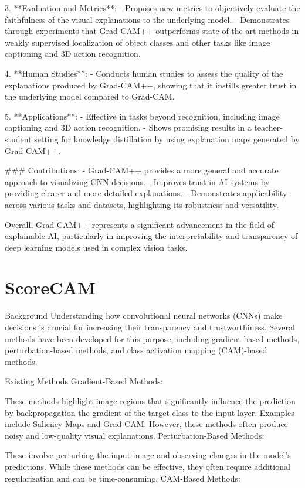 3. **Evaluation and Metrics**:
   - Proposes new metrics to objectively evaluate the faithfulness of the visual explanations to the underlying model.
   - Demonstrates through experiments that Grad-CAM++ outperforms state-of-the-art methods in weakly supervised localization of object classes and other tasks like image captioning and 3D action recognition.

4. **Human Studies**:
   - Conducts human studies to assess the quality of the explanations produced by Grad-CAM++, showing that it instills greater trust in the underlying model compared to Grad-CAM.

5. **Applications**:
   - Effective in tasks beyond recognition, including image captioning and 3D action recognition.
   - Shows promising results in a teacher-student setting for knowledge distillation by using explanation maps generated by Grad-CAM++.

### Contributions:
- Grad-CAM++ provides a more general and accurate approach to visualizing CNN decisions.
- Improves trust in AI systems by providing clearer and more detailed explanations.
- Demonstrates applicability across various tasks and datasets, highlighting its robustness and versatility.

Overall, Grad-CAM++ represents a significant advancement in the field of explainable AI, particularly in improving the interpretability and transparency of deep learning models used in complex vision tasks.

\section{ScoreCAM}
Background
Understanding how convolutional neural networks (CNNs) make decisions is crucial for increasing their transparency and trustworthiness. Several methods have been developed for this purpose, including gradient-based methods, perturbation-based methods, and class activation mapping (CAM)-based methods.

Existing Methods
Gradient-Based Methods:

These methods highlight image regions that significantly influence the prediction by backpropagation the gradient of the target class to the input layer.
Examples include Saliency Maps and Grad-CAM. However, these methods often produce noisy and low-quality visual explanations.
Perturbation-Based Methods:

These involve perturbing the input image and observing changes in the model's predictions.
While these methods can be effective, they often require additional regularization and can be time-consuming.
CAM-Based Methods:


